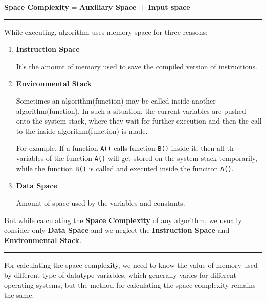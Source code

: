\textbf{Space Complexity} = \textbf{Auxiliary Space + Input space}

\begin{center}\rule{0.5\linewidth}{0.5pt}\end{center}

\hypertarget{memory-usage-while-execution}{%
\label{memory-usage-while-execution}}

While executing, algorithm uses memory space for three reasons:

\begin{enumerate}
\item
  \textbf{Instruction Space}

  It's the amount of memory used to save the compiled version of
  instructions.
\item
  \textbf{Environmental Stack}

  Sometimes an algorithm(function) may be called inside another
  algorithm(function). In such a situation, the current variables are
  pushed onto the system stack, where they wait for further execution
  and then the call to the inside algorithm(function) is made.

  For example, If a function \texttt{A()} calls function \texttt{B()}
  inside it, then all th variables of the function \texttt{A()} will get
  stored on the system stack temporarily, while the function
  \texttt{B()} is called and executed inside the funciton \texttt{A()}.
\item
  \textbf{Data Space}

  Amount of space used by the variables and constants.
\end{enumerate}

But while calculating the \textbf{Space Complexity} of any algorithm, we usually consider only \textbf{Data Space} and we neglect the \textbf{Instruction Space} and \textbf{Environmental Stack}.

\begin{center}\rule{0.5\linewidth}{0.5pt}\end{center}

\hypertarget{calculating-the-space-complexity}{%
\label{calculating-the-space-complexity}}

For calculating the space complexity, we need to know the value of
memory used by different type of datatype variables, which generally
varies for different operating systems, but the method for calculating
the space complexity remains the same.

